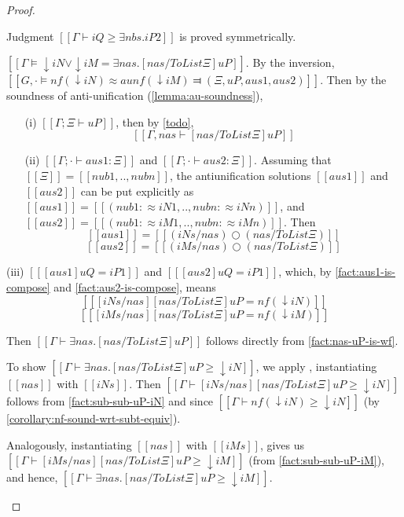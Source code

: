 \begin{proof}
\begin{caseof}
     Judgment $[[Γ ⊢ iQ ≥ ∃nbs.iP2]]$ is proved symmetrically.
  \item $[[Γ ⊨ ↓iN ∨ ↓iM = ∃nas.[nas / ToList Ξ]uP]]$.
    By the inversion, $[[G,· ⊨ nf(↓iN) ≈au nf(↓iM) ⫤ (Ξ, uP, aus1, aus2)]]$.
    Then by the soundness of anti-unification (\cref{lemma:au-soundness}),
    \begin{enumerate}
    \item[(i)] $[[Γ ; Ξ ⊢ uP]]$, then
      by \cref{todo},
      \begin{equation} \label{fact:nas-uP-is-wf} [[Γ, nas ⊢ [nas / ToList Ξ]uP]] \end{equation}
    \item[(ii)] $[[Γ ; · ⊢ aus1 : Ξ]]$ and $[[Γ ; · ⊢ aus2 : Ξ]]$.
      Assuming that $[[Ξ]] = [[nub1,..,nubn]]$,
      the antiunification solutions $[[aus1]]$ and $[[aus2]]$ can be
      put explicitly as $[[aus1]] = [[(nub1 :≈ iN1,..,nubn :≈ iNn)]]$,
      and $[[aus2]] = [[(nub1 :≈ iM1,..,nubn :≈ iMn)]]$.
      Then
      \begin{equation}
        \label{fact:aus1-is-compose}
        [[ aus1 ]] = [[ (iNs / nas) ○ (nas / ToList Ξ) ]] 
      \end{equation}
      \begin{equation}
        \label{fact:aus2-is-compose}
        [[ aus2 ]] = [[ (iMs / nas) ○ (nas / ToList Ξ) ]]
      \end{equation}
    \end{enumerate}
  \item[(iii)] $[[ [aus1] uQ = iP1 ]]$ and $[[ [aus2] uQ = iP1 ]]$,
    which, by \ref{fact:aus1-is-compose} and \ref{fact:aus2-is-compose},
    means
    \begin{equation}
      \label{fact:sub-sub-uP-iN}
      [[ [iNs / nas][nas / ToList Ξ]uP = nf(↓iN) ]]
    \end{equation}
    \begin{equation}
      \label{fact:sub-sub-uP-iM}
      [[ [iMs / nas][nas / ToList Ξ]uP = nf(↓iM) ]]
    \end{equation}

    Then $[[Γ ⊢ ∃nas.[nas / ToList Ξ]uP]]$
    follows directly from \ref{fact:nas-uP-is-wf}.

    To show $[[Γ ⊢ ∃nas.[nas / ToList Ξ]uP ≥ ↓iN]]$,
    we apply ,
    instantiating $[[nas]]$ with $[[iNs]]$.
    Then $[[Γ ⊢ [iNs / nas][nas / ToList Ξ]uP ≥ ↓iN ]]$ follows
    from \ref{fact:sub-sub-uP-iN} and 
    since $[[Γ ⊢ nf(↓iN) ≥ ↓iN]]$ (by \cref{corollary:nf-sound-wrt-subt-equiv}).

    Analogously, instantiating $[[nas]]$ with $[[iMs]]$,
    gives us $[[Γ ⊢ [iMs / nas][nas / ToList Ξ]uP ≥ ↓iM ]]$
    (from \ref{fact:sub-sub-uP-iM}), and hence,
    $[[Γ ⊢ ∃nas.[nas / ToList Ξ]uP ≥ ↓iM]]$.

  \end{caseof}

\end{proof}


